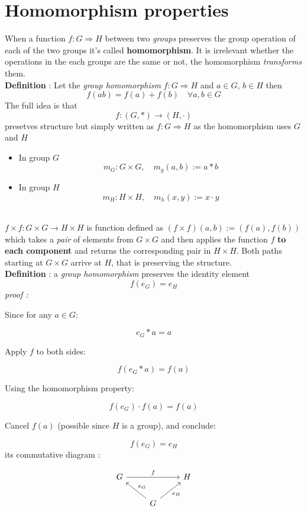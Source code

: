 \documentclass[12pt]{article}
\begin{document}
\section*{Homomorphism properties}
When a function $f:G \Rightarrow H$ between two \textit{groups} preserves the group operation of each of the two groups it's called \textbf{homomorphism}.
It is irrelevant whether the operations in the each  groups are the same or not, the homomorphism \textit{transforms} them.
\vspace{1cm}\\
\textbf{Definition} : Let the \textit{group homomorphism} $f:G \Rightarrow H$ and $a \in G$, $b \in H$ then
$$f(ab)=f(a)+f(b) \quad \forall a,b \in G$$
The full idea is that 
$$f:(G,*) \rightarrow (H,\cdot)$$
presetves structure but simply written as $f:G \Rightarrow H$ as the homomorphism uses $G$ and $H$
\begin{itemize}
	\item In group $G$
	$$m_G : G \times G, \quad m_g(a,b) := a*b$$
	\item In group $H$
	$$m_H : H \times H, \quad m_h(x,y) := x \cdot y$$
\end{itemize}
\vspace{1cm}
$$

$$
\vspace{1cm} \\
$f \times f : G \times G \rightarrow H \times H$ is function defined as $(f \times f)(a,b) := (f(a),f(b))$ which takes a \textit{pair} of elements from $G \times G$ and then applies the function $f$ \textbf{to each component} and returns the corresponding pair in $H \times H$. Both paths starting at $G \times G$ arrive at $H$, that is preserving the structure.
\vspace{1cm} \\
\textbf{Definition} : a \textit{group homomorphism} preserves the identity element 
$$
f(e_G)=e_H
$$
\textit{proof :}

Since for any $a \in G$:

$$
e_G * a = a
$$

Apply $f$ to both sides:

$$
f(e_G * a) = f(a)
$$

Using the homomorphism property:

$$
f(e_G) \cdot f(a) = f(a)
$$

Cancel $f(a)$ (possible since $H$  is a group), and conclude:

$$
f(e_G) = e_H
$$
its commutative diagram :

$$
\begin{tikzcd}
	G \arrow[rr, "f"] & & H \\
	& G \arrow[ul, "e_G"'] \arrow[ur, "e_H"']
\end{tikzcd}
$$
\end{document}
